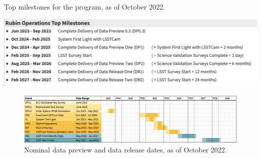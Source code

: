 \begin{table}
\caption{Top milestones for the \es program, as of October 2022.}
\label{tab:milestones}
\includegraphics[width=\linewidth]{figures/DPR-milestones}
\end{table}
\begin{figure}
\includegraphics[width=\linewidth]{figures/DPR-timeline}
\caption{Nominal data preview and data release dates, as of October 2022.}
\label{fig:timeline}
\end{figure}

%
%
%
%
%
%
%
%
